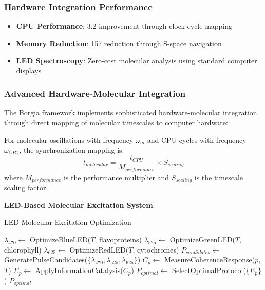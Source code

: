 \documentclass[11pt,a4paper]{article}
\begin{document}
\subsubsection{Hardware Integration Performance}
\begin{itemize}
\item \textbf{CPU Performance}: 3.2 \times improvement through clock cycle mapping
\item \textbf{Memory Reduction}: 157 \times reduction through S-space navigation
\item \textbf{LED Spectroscopy}: Zero-cost molecular analysis using standard computer displays
\end{itemize}

\subsubsection{Advanced Hardware-Molecular Integration}

The Borgia framework implements sophisticated hardware-molecular integration through direct mapping of molecular timescales to computer hardware:

\begin{definition}
For molecular oscillations with frequency $\omega_m$ and CPU cycles with frequency $\omega_{CPU}$, the synchronization mapping is:
\begin{equation}
t_{molecular} = \frac{t_{CPU}}{M_{performance}} \times S_{scaling}
\end{equation}
where $M_{performance}$ is the performance multiplier and $S_{scaling}$ is the timescale scaling factor.
\end{definition}

\textbf{LED-Based Molecular Excitation System}:

\begin{algorithm}
\caption{LED-Molecular Excitation Optimization}
\begin{algorithmic}
    \State $\lambda_{470} \leftarrow$ OptimizeBlueLED($T$, flavoproteins)
    \State $\lambda_{525} \leftarrow$ OptimizeGreenLED($T$, chlorophyll)
    \State $\lambda_{625} \leftarrow$ OptimizeRedLED($T$, cytochromes)
    \State $P_{candidates} \leftarrow$ GeneratePulseCandidates($\{\lambda_{470}, \lambda_{525}, \lambda_{625}\}$)
        \State $C_p \leftarrow$ MeasureCoherenceResponse($p$, $T$)
        \State $E_p \leftarrow$ ApplyInformationCatalysis($C_p$)
    \EndFor
    \State $P_{optimal} \leftarrow$ SelectOptimalProtocol($\{E_p\}$)
    \State \Return $P_{optimal}$
\EndProcedure
\end{algorithmic}
\end{algorithm}
\end{document}
